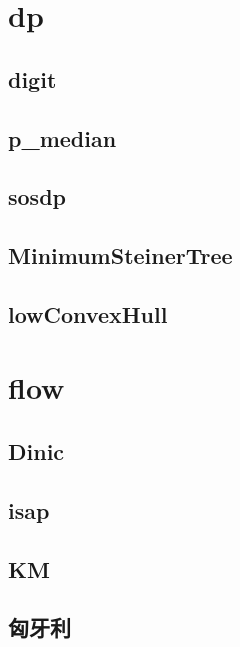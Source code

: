 \documentclass[a4paper,10pt,twocolumn,oneside]{article}
\begin{document}
\section{dp}
    \subsection{digit}
    

    \subsection{p\_median}
    

    \subsection{sosdp}
    

    \subsection{MinimumSteinerTree}
    

    \subsection{lowConvexHull}
    

\section{flow}
    \subsection{Dinic}
    

    \subsection{isap}
    

    \subsection{KM}
    

    \subsection{匈牙利}
    
\end{document}
